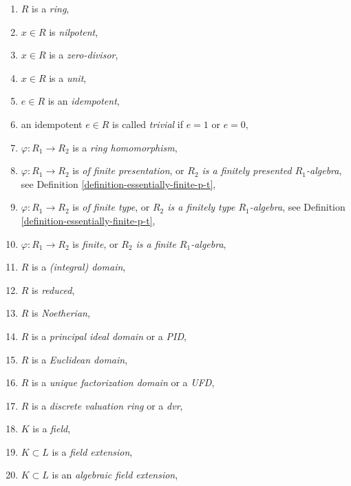 \begin{enumerate}
\item $R$ is a {\it ring},
\label{item-ring}
\item $x\in R$ is {\it nilpotent},
\label{item-ring-element-nilpotent}
\item $x\in R$ is a {\it zero-divisor},
\label{item-ring-element-zerodivisor}
\item $x\in R$ is a {\it unit},
\label{item-ring-element-unit}
\item $e \in R$ is an {\it idempotent},
\label{item-ring-element-idempotent}
\item an idempotent $e \in R$ is called {\it trivial}
if $e = 1$ or $e = 0$,
\label{item-idempotent-trivial}
\item $\varphi : R_1 \to R_2$ is a {\it ring homomorphism},
\label{item-ring-homomorphism}
\item $\varphi : R_1 \to R_2$ is {\it of finite presentation}, or
{\it $R_2$ is a finitely presented $R_1$-algebra},
see Definition \ref{definition-essentially-finite-p-t},
\label{item-ring-homomorphism-finite-presentation}
\item $\varphi : R_1 \to R_2$ is {\it of finite type}, or
{\it $R_2$ is a finitely type $R_1$-algebra},
see Definition \ref{definition-essentially-finite-p-t},
\label{item-ring-homomorphism-finite-type}
\item $\varphi : R_1 \to R_2$ is {\it finite}, or
{\it $R_2$ is a finite $R_1$-algebra},
\label{item-ring-homomorphism-finite}
\item $R$ is a {\it (integral) domain},
\label{item-ring-domain}
\item $R$ is {\it reduced},
\label{item-ring-reduced}
\item $R$ is {\it Noetherian},
\label{item-ring-Noetherian}
\item $R$ is a {\it principal ideal domain} or a {\it PID},
\label{item-ring-PID}
\item $R$ is a {\it Euclidean domain},
\label{item-ring-Euclidean}
\item $R$ is a {\it unique factorization domain} or a {\it UFD},
\label{item-ring-UFD}
\item $R$ is a {\it discrete valuation ring} or a {\it dvr},
\label{item-ring-dvr}
\item $K$ is a {\it field},
\label{item-field}
\item $K \subset L$ is a {\it field extension},
\label{item-field-extension}
\item $K \subset L$ is an {\it algebraic field extension},

\end{enumerate}
